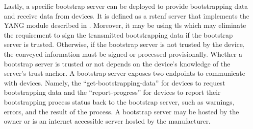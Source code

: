 \begin{itemize}
Lastly, a specific bootstrap server can be deployed to provide bootstrapping data and receive data from devices. It is defined as a \gls{rstcnf} server that implements the YANG module described in \cite[Section~7]{sztp}. Moreover, it may be using \gls{tls} which may eliminate the requirement to sign the transmitted bootstrapping data if the bootstrap server is trusted. Otherwise, if the bootstrap server is not trusted by the device, the conveyed information must be signed or processed provisionally. Whether a bootstrap server is trusted or not depends on the device’s knowledge of the server’s trust anchor. A bootstrap server exposes two endpoints to communicate with devices. Namely, the ``get-bootstrapping-data” for devices to request bootstrapping data and the ``report-progress” for devices to report their bootstrapping process status back to the bootstrap server, such as warnings, errors, and the result of the process. A bootstrap server may be hosted by the owner or is an internet accessible server hosted by the manufacturer.

\end{itemize}
